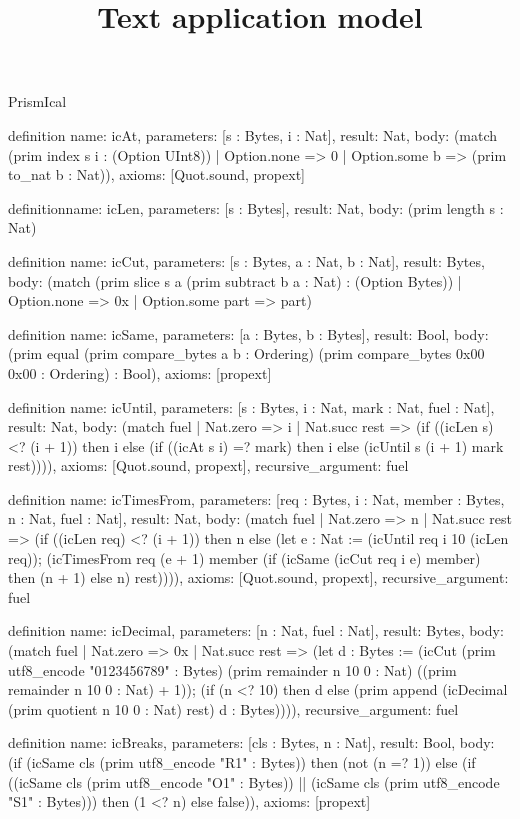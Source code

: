 \begin{lexlean}{PrismIcal}
\title{Text application model}
\begin{semanticmodule}
definition{
  name: icAt,
  parameters: [s : Bytes, i : Nat],
  result: Nat,
  body: (match (prim index s i : (Option UInt8))
    | Option.none => 0
    | Option.some b => (prim to_nat b : Nat)),
  axioms: [Quot.sound, propext]
}

definition{name: icLen, parameters: [s : Bytes], result: Nat, body: (prim length s : Nat)}

definition{
  name: icCut,
  parameters: [s : Bytes, a : Nat, b : Nat],
  result: Bytes,
  body: (match (prim slice s a (prim subtract b a : Nat) : (Option Bytes))
    | Option.none => 0x
    | Option.some part => part)
}

definition{
  name: icSame,
  parameters: [a : Bytes, b : Bytes],
  result: Bool,
  body: (prim equal (prim compare_bytes a b : Ordering) (prim compare_bytes 0x00 0x00 : Ordering) : Bool),
  axioms: [propext]
}

definition{
  name: icUntil,
  parameters: [s : Bytes, i : Nat, mark : Nat, fuel : Nat],
  result: Nat,
  body: (match fuel
    | Nat.zero => i
    | Nat.succ rest => (if ((icLen s) <? (i + 1)) then i else (if ((icAt s i) =? mark) then i else (icUntil s (i + 1) mark rest)))),
  axioms: [Quot.sound, propext],
  recursive_argument: fuel
}

definition{
  name: icTimesFrom,
  parameters: [req : Bytes, i : Nat, member : Bytes, n : Nat, fuel : Nat],
  result: Nat,
  body: (match fuel
    | Nat.zero => n
    | Nat.succ rest => (if ((icLen req) <? (i + 1)) then n else (let e : Nat := (icUntil req i 10 (icLen req)); (icTimesFrom req (e + 1) member (if (icSame (icCut req i e) member) then (n + 1) else n) rest)))),
  axioms: [Quot.sound, propext],
  recursive_argument: fuel
}

definition{
  name: icDecimal,
  parameters: [n : Nat, fuel : Nat],
  result: Bytes,
  body: (match fuel
    | Nat.zero => 0x
    | Nat.succ rest => (let d : Bytes := (icCut (prim utf8_encode "0123456789" : Bytes) (prim remainder n 10 0 : Nat) ((prim remainder n 10 0 : Nat) + 1)); (if (n <? 10) then d else (prim append (icDecimal (prim quotient n 10 0 : Nat) rest) d : Bytes)))),
  recursive_argument: fuel
}

definition{
  name: icBreaks,
  parameters: [cls : Bytes, n : Nat],
  result: Bool,
  body: (if (icSame cls (prim utf8_encode "R1" : Bytes)) then (not (n =? 1)) else (if ((icSame cls (prim utf8_encode "O1" : Bytes)) || (icSame cls (prim utf8_encode "S1" : Bytes))) then (1 <? n) else false)),
  axioms: [propext]
}


\end{semanticmodule}
\end{lexlean}
